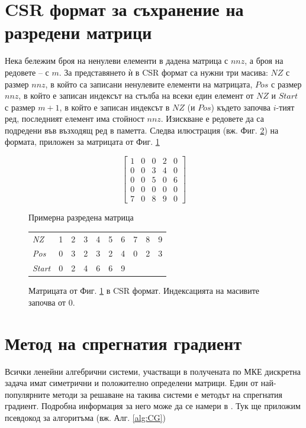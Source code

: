 \documentclass[12pt]{report}
\begin{document}
\section{CSR формат за съхранение на разредени матрици}
Нека бележим броя на ненулеви елементи в дадена матрица с $nnz$, а броя на редовете -- с $m$. За представянето ѝ в CSR формат са нужни три масива: $NZ$ с размер $nnz$, в който са записани ненулевите елементи на матрицата, $Pos$ с размер $nnz$, в който е записан индексът на стълба на всеки един елемент от $NZ$ и $Start$ с размер $m+1$, в който е записан индексът в $NZ$ (и $Pos$) където започва $i$-тият ред, последният елемент има стойност $nnz$. Изискване е редовете да са подредени във възходящ ред в паметта. Следва илюстрация (вж. Фиг. \ref{fig:example_csr_sparse_matrix}) на формата, приложен за матрицата от Фиг. \ref{fig:example_sparse_matrix}
\begin{figure}[H]
$$
\begin{bmatrix}
	1 & 0 & 0 & 2 & 0\\
	0 & 0 & 3 & 4 & 0\\
	0 & 0 & 5 & 0 & 6\\
	0 & 0 & 0 & 0 & 0\\
	7 & 0 & 8 & 9 & 0
\end{bmatrix}
$$
\caption{Примерна разредена матрица}\label{fig:example_sparse_matrix}
\end{figure}

\begin{figure}[H]
\centering
\begin{tabular}{l|ccccccccc}
\cline{2-10}
\textit{NZ}    & 1 & 2 & 3 & 4 & 5 & 6                      & 7 & 8 & \multicolumn{1}{c|}{9} \\ \cline{2-10}
\textit{Pos}   & 0 & 3 & 2 & 3 & 2 & 4                      & 0 & 2 & \multicolumn{1}{c|}{3} \\ \cline{2-10}
\textit{Start} & 0 & 2 & 4 & 6 & 6 & \multicolumn{1}{c|}{9} &   &   &                        \\ \cline{2-7}
\end{tabular}\caption{Матрицата от Фиг. \ref{fig:example_sparse_matrix} в CSR формат. Индексацията на масивите започва от 0.}\label{fig:example_csr_sparse_matrix}
\end{figure}

\section{Метод на спрегнатия градиент}
Всички ленейни алгебрични системи, участващи в получената по МКЕ дискретна задача имат симетрични и положително определени матрици. Един от най-популярните методи за решаване на такива системи е методът на спрегнатия градиент. Подробна информация за него може да се намери в \cite{saad-sparse}. Тук ще приложим псевдокод за алгоритъма (вж. Алг. \ref{alg:CG})
\end{document}

